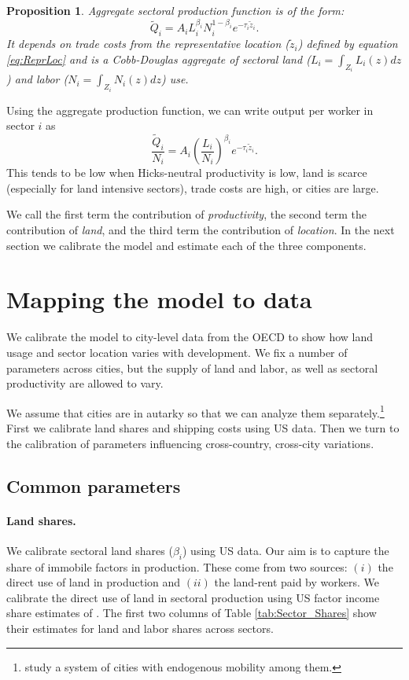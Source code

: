 \documentclass[12pt]{article}
\newtheorem{proposition}{Proposition}
\begin{document}
\begin{proposition}\label{prop:aggregation}
Aggregate sectoral production function is of the form:
\begin{equation}
\tilde Q_i =
A_iL_i^{\beta_i}N_i^{1-\beta_i}
 e^{-\tau_i\tilde z_i}.
\end{equation}
It depends on trade costs from the representative location ($\tilde{z}_i$) defined by equation \eqref{eq:ReprLoc} and is a Cobb-Douglas aggregate of sectoral land ($L_i=\int_{Z_i}L_i(z)dz$) and labor ($N_i=\int_{Z_i}N_i(z)dz$) use.
\end{proposition}

Using the aggregate production function, we can write output per worker in sector $i$ as
\begin{equation}\label{eq:output_per_worker}
\frac{\tilde Q_i}{N_i} = 
A_i
 \left(
 \frac{L_i}
 {N_i}\right)^{\beta_i}e^{-\tau_i\tilde z_i}.
\end{equation}
This tends to be low when Hicks-neutral productivity is low, land is scarce (especially for land intensive sectors), trade costs are high, or cities are large.

We call the first term the contribution of \emph{productivity}, the second term the contribution of \emph{land}, and the third term the contribution of \emph{location}. In the next section we calibrate the model and estimate each of the three components.


\section{Mapping the model to data}
We calibrate the model to city-level data from the OECD to show how land usage and sector location varies with development. We fix a number of parameters across cities, but the supply of land and labor, as well as sectoral productivity are allowed to vary.

We assume that cities are in autarky so that we can analyze them separately.\footnote{ study a system of cities with endogenous mobility among them.} First we calibrate land shares and shipping costs using US data. Then we turn to the calibration of parameters influencing cross-country, cross-city variations.

\subsection{Common parameters}
\paragraph{Land shares.}
We calibrate sectoral land shares ($\beta_i$) using US data. Our aim is to capture the share of immobile factors in production. These come from two sources: $(i)$ the direct use of land in production and $(ii)$ the land-rent paid by workers. We calibrate the direct use of land in sectoral production using US factor income share estimates of . The first two columns of Table \ref{tab:Sector_Shares} show their estimates for land and labor shares across sectors.
\end{document}
